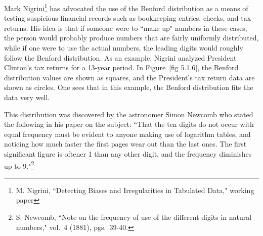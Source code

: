 Mark Nigrini\footnote{M. Nigrini, ``Detecting Biases and Irregularities in
Tabulated Data," working paper} has advocated the use of the Benford distribution as a means of
testing suspicious financial records such as bookkeeping entries,
checks, and tax returns.  His idea is that if someone were to ``make up" numbers
in these cases, the person would probably produce numbers that are fairly uniformly distributed,
while if one were to use the actual numbers, the leading digits would roughly follow the Benford
distribution.   As an example, Nigrini analyzed President Clinton's tax returns
for a 13-year period.  In Figure~\ref{fig 5.1.6}, the Benford distribution values are shown as
squares, and the President's tax return data are shown as circles.  One sees that in this example, the
Benford distribution fits the data very well.
\par
This distribution was discovered by the astronomer Simon Newcomb who stated the
following in his paper on the subject:  ``That the ten digits do not occur with equal frequency must
be evident to anyone making use of logarithm tables, and noticing how much faster the first pages
wear out than the last ones.  The first significant figure is oftener 1 than any other digit, and the
frequency diminishes up to 9."\footnote{S. Newcomb, ``Note on the frequency of use of the different
digits in natural numbers,"  vol.\ 4 (1881), pgs.\ 39-40.}
\exercises
